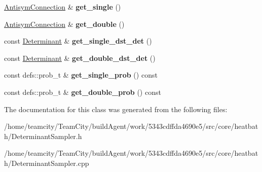 \begin{DoxyCompactItemize}
\item 
\hyperlink{classAntisymConnection}{Antisym\+Connection} \& {\bfseries get\+\_\+single} ()\hypertarget{classDeterminantSampler_a495794b8f68f0dfec00cd2162123dd78}{}\label{classDeterminantSampler_a495794b8f68f0dfec00cd2162123dd78}

\item 
\hyperlink{classAntisymConnection}{Antisym\+Connection} \& {\bfseries get\+\_\+double} ()\hypertarget{classDeterminantSampler_a8a6ec6cd34ec3dbed33d550b03142a44}{}\label{classDeterminantSampler_a8a6ec6cd34ec3dbed33d550b03142a44}

\item 
const \hyperlink{classDeterminant}{Determinant} \& {\bfseries get\+\_\+single\+\_\+dst\+\_\+det} ()\hypertarget{classDeterminantSampler_a0433b57f3cb61e4c438f567dc8bbcb6b}{}\label{classDeterminantSampler_a0433b57f3cb61e4c438f567dc8bbcb6b}

\item 
const \hyperlink{classDeterminant}{Determinant} \& {\bfseries get\+\_\+double\+\_\+dst\+\_\+det} ()\hypertarget{classDeterminantSampler_a971cee489d38916d37b8775b6badf55a}{}\label{classDeterminantSampler_a971cee489d38916d37b8775b6badf55a}

\item 
const defs\+::prob\+\_\+t \& {\bfseries get\+\_\+single\+\_\+prob} () const \hypertarget{classDeterminantSampler_ace0b206ab8ad63e06beb5b7d3aeceb27}{}\label{classDeterminantSampler_ace0b206ab8ad63e06beb5b7d3aeceb27}

\item 
const defs\+::prob\+\_\+t \& {\bfseries get\+\_\+double\+\_\+prob} () const \hypertarget{classDeterminantSampler_aa5996c50c825bad211573ac90f91629f}{}\label{classDeterminantSampler_aa5996c50c825bad211573ac90f91629f}

\end{DoxyCompactItemize}


The documentation for this class was generated from the following files\+:\begin{DoxyCompactItemize}
\item 
/home/teamcity/\+Team\+City/build\+Agent/work/5343cdffda4690e5/src/core/heatbath/Determinant\+Sampler.\+h\item 
/home/teamcity/\+Team\+City/build\+Agent/work/5343cdffda4690e5/src/core/heatbath/Determinant\+Sampler.\+cpp\end{DoxyCompactItemize}
